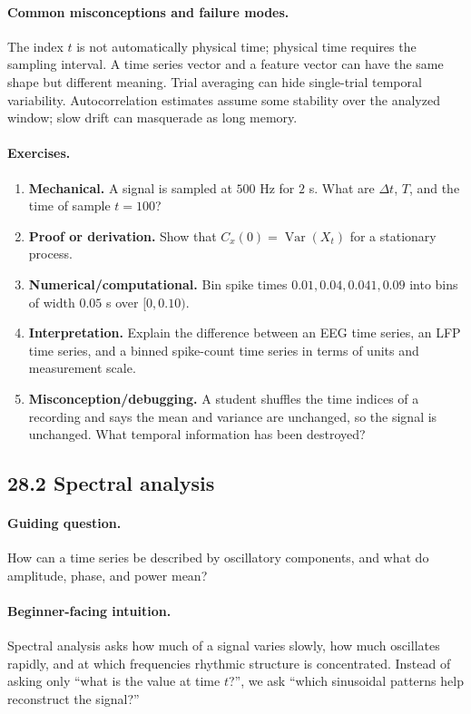 \paragraph{Common misconceptions and failure modes.}
The index \(t\) is not automatically physical time; physical time requires the sampling interval. A time series vector and a feature vector can have the same shape but different meaning. Trial averaging can hide single-trial temporal variability. Autocorrelation estimates assume some stability over the analyzed window; slow drift can masquerade as long memory.

\paragraph{Exercises.}
\begin{enumerate}[label=\textbf{28.1.\arabic*.}, leftmargin=*]
\item \textbf{Mechanical.} A signal is sampled at \(500\) Hz for \(2\) s. What are \(\Delta t\), \(T\), and the time of sample \(t=100\)?
\item \textbf{Proof or derivation.} Show that \(C_x(0)=\operatorname{Var}(X_t)\) for a stationary process.
\item \textbf{Numerical/computational.} Bin spike times \(0.01,0.04,0.041,0.09\) into bins of width \(0.05\) s over \([0,0.10)\).
\item \textbf{Interpretation.} Explain the difference between an EEG time series, an LFP time series, and a binned spike-count time series in terms of units and measurement scale.
\item \textbf{Misconception/debugging.} A student shuffles the time indices of a recording and says the mean and variance are unchanged, so the signal is unchanged. What temporal information has been destroyed?
\end{enumerate}

\subsection{28.2 Spectral analysis}

\paragraph{Guiding question.}
How can a time series be described by oscillatory components, and what do amplitude, phase, and power mean?

\paragraph{Beginner-facing intuition.}
Spectral analysis asks how much of a signal varies slowly, how much oscillates rapidly, and at which frequencies rhythmic structure is concentrated. Instead of asking only ``what is the value at time \(t\)?'', we ask ``which sinusoidal patterns help reconstruct the signal?''

